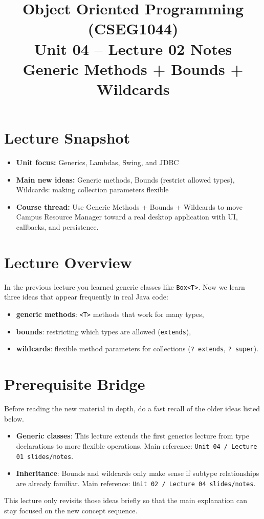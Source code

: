 \documentclass[11pt]{article}
\title{Object Oriented Programming (CSEG1044)\\Unit 04 -- Lecture 02 Notes\\Generic Methods + Bounds + Wildcards}
\begin{document}
\maketitle
\tableofcontents

\section{Lecture Snapshot}
\begin{itemize}
  \item \textbf{Unit focus:} Generics, Lambdas, Swing, and JDBC
  \item \textbf{Main new ideas:} Generic methods, Bounds (restrict allowed types), Wildcards: making collection parameters flexible
  \item \textbf{Course thread:} Use Generic Methods + Bounds + Wildcards to move Campus Resource Manager toward a real desktop application with UI, callbacks, and persistence.
\end{itemize}
\notesources{\OOPSUnitIVSources}

\section{Lecture Overview}
In the previous lecture you learned generic classes like \texttt{Box<T>}.
Now we learn three ideas that appear frequently in real Java code:
\begin{itemize}
  \item \textbf{generic methods}: \texttt{<T>} methods that work for many types,
  \item \textbf{bounds}: restricting which types are allowed (\texttt{extends}),
  \item \textbf{wildcards}: flexible method parameters for collections (\texttt{? extends}, \texttt{? super}).
\end{itemize}
\notesources{\OOPSUnitIVSources}

\section{Prerequisite Bridge}
Before reading the new material in depth, do a fast recall of the older ideas listed below.
\begin{itemize}
  \item \textbf{Generic classes}: This lecture extends the first generics lecture from type declarations to more flexible operations. Main reference: \texttt{Unit 04 / Lecture 01 slides/notes}.
  \item \textbf{Inheritance}: Bounds and wildcards only make sense if subtype relationships are already familiar. Main reference: \texttt{Unit 02 / Lecture 04 slides/notes}.
\end{itemize}
This lecture only revisits those ideas briefly so that the main explanation can stay focused on the new concept sequence.
\notesources{\OOPSUnitIVSources}
\end{document}
